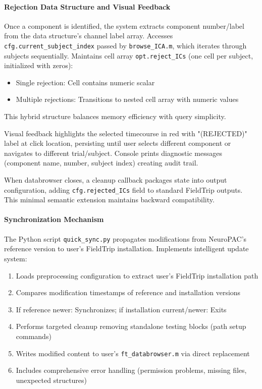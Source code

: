 \documentclass[12pt]{report}
\begin{document}
\paragraph{Rejection Data Structure and Visual Feedback}\mbox{}

Once a component is identified, the system extracts component number/label from the data structure's channel label array. Accesses \verb|cfg.current_subject_index| passed by \verb|browse_ICA.m|, which iterates through subjects sequentially. Maintains cell array \verb|opt.reject_ICs| (one cell per subject, initialized with zeros):

\begin{itemize}
\item Single rejection: Cell contains numeric scalar
\item Multiple rejections: Transitions to nested cell array with numeric values
\end{itemize}

This hybrid structure balances memory efficiency with query simplicity.

Visual feedback highlights the selected timecourse in red with "(REJECTED)" label at click location, persisting until user selects different component or navigates to different trial/subject. Console prints diagnostic messages (component name, number, subject index) creating audit trail.

When databrowser closes, a cleanup callback packages state into output configuration, adding \verb|cfg.rejected_ICs| field to standard FieldTrip outputs. This minimal semantic extension maintains backward compatibility.

\paragraph{Synchronization Mechanism}\mbox{}

The Python script \verb|quick_sync.py| propagates modifications from NeuroPAC's reference version to user's FieldTrip installation. Implements intelligent update system:

\begin{enumerate}
\item Loads preprocessing configuration to extract user's FieldTrip installation path
\item Compares modification timestamps of reference and installation versions
\item If reference newer: Synchronizes; if installation current/newer: Exits
\item Performs targeted cleanup removing standalone testing blocks (path setup commands)
\item Writes modified content to user's \verb|ft_databrowser.m| via direct replacement
\item Includes comprehensive error handling (permission problems, missing files, unexpected structures)
\end{enumerate}
\end{document}
